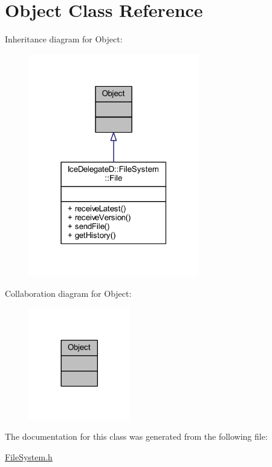 \hypertarget{class_ice_delegate_d_1_1_ice_1_1_object}{}\section{Object Class Reference}
\label{class_ice_delegate_d_1_1_ice_1_1_object}


Inheritance diagram for Object\+:
\nopagebreak
\begin{figure}[H]
\begin{center}
\leavevmode
\includegraphics[width=210pt]{class_ice_delegate_d_1_1_ice_1_1_object__inherit__graph}
\end{center}
\end{figure}


Collaboration diagram for Object\+:
\nopagebreak
\begin{figure}[H]
\begin{center}
\leavevmode
\includegraphics[width=125pt]{class_ice_delegate_d_1_1_ice_1_1_object__coll__graph}
\end{center}
\end{figure}


The documentation for this class was generated from the following file\+:\begin{DoxyCompactItemize}
\item 
\hyperlink{_file_system_8h}{File\+System.\+h}\end{DoxyCompactItemize}
